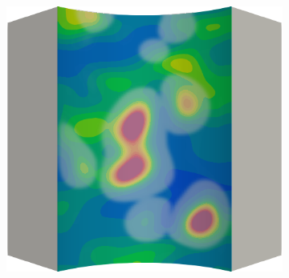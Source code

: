 \begin{frame}
\begin{columns}[T]
\begin{column}{0.6\textwidth}
\begin{figure}
{\begin{subfigure}{0.19\textwidth}
          \end{subfigure}
          \hspace{0.06\textwidth}
          \begin{subfigure}{0.19\textwidth}
            \centering
            \includegraphics[width=\textwidth]{examples/figures/ep.0021}
          \end{subfigure}
        }
        

\end{figure}
\end{column}
\end{columns}
\end{frame}
